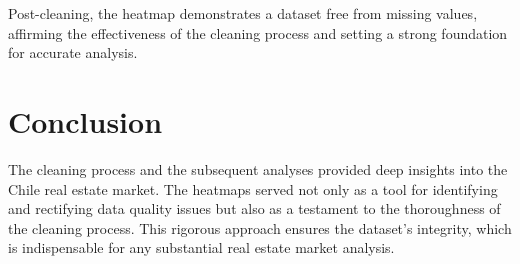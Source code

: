 \documentclass{article}
\begin{document}
Post-cleaning, the heatmap demonstrates a dataset free from missing values, affirming the effectiveness of the cleaning process and setting a strong foundation for accurate analysis.

\section{Conclusion}
The cleaning process and the subsequent analyses provided deep insights into the Chile real estate market. The heatmaps served not only as a tool for identifying and rectifying data quality issues but also as a testament to the thoroughness of the cleaning process. This rigorous approach ensures the dataset's integrity, which is indispensable for any substantial real estate market analysis.
\end{document}
